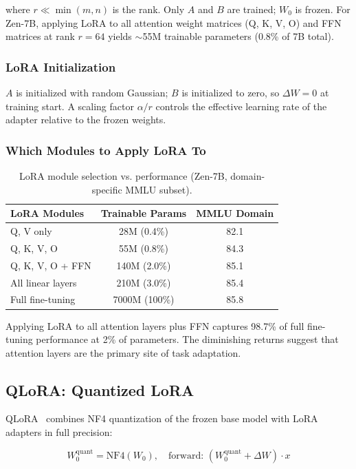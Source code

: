 \documentclass[11pt,a4paper]{article}
\begin{document}
where $r \ll \min(m, n)$ is the rank. Only $A$ and $B$ are trained; $W_0$ is frozen.
For Zen-7B, applying LoRA to all attention weight matrices (Q, K, V, O) and FFN
matrices at rank $r=64$ yields $\sim$55M trainable parameters (0.8\% of 7B total).

\subsubsection{LoRA Initialization}

$A$ is initialized with random Gaussian; $B$ is initialized to zero, so $\Delta W = 0$
at training start. A scaling factor $\alpha/r$ controls the effective learning rate
of the adapter relative to the frozen weights.

\subsubsection{Which Modules to Apply LoRA To}

\begin{table}[H]
\centering
\begin{tabular}{lcc}
\toprule
\textbf{LoRA Modules} & \textbf{Trainable Params} & \textbf{MMLU Domain} \\
\midrule
Q, V only & 28M (0.4\%) & 82.1 \\
Q, K, V, O & 55M (0.8\%) & 84.3 \\
Q, K, V, O + FFN & 140M (2.0\%) & 85.1 \\
All linear layers & 210M (3.0\%) & 85.4 \\
Full fine-tuning & 7000M (100\%) & 85.8 \\
\bottomrule
\end{tabular}
\caption{LoRA module selection vs. performance (Zen-7B, domain-specific MMLU subset).}
\end{table}

Applying LoRA to all attention layers plus FFN captures 98.7\% of full fine-tuning
performance at 2\% of parameters. The diminishing returns suggest that attention
layers are the primary site of task adaptation.

\subsection{QLoRA: Quantized LoRA}

QLoRA~\cite{dettmers2023qlora} combines NF4 quantization of the frozen base model
with LoRA adapters in full precision:

\begin{equation}
W_0^\text{quant} = \text{NF4}(W_0), \quad \text{forward: } (W_0^\text{quant} + \Delta W) \cdot x
\end{equation}
\end{document}
